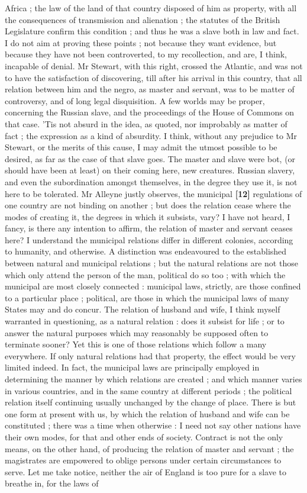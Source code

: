 \documentclass[a4paper]{article}
\begin{document}
Africa ; the law of the land of that country disposed of him as property, with all the consequences of transmission and alienation ; the statutes of the British Legislature confirm this condition ; and thus he was a slave both in law and fact. I do not aim at proving these points ; not because they want evidence, but because they have not been controverted, to my recollection, and are, I think, incapable of denial. Mr Stewart, with this right, crossed the Atlantic, and was not to have the satisfaction of discovering, till after his arrival in this country, that all relation between him and the negro, as master and servant, was to be matter of controversy, and of long legal disquisition. A few worlds may be proper, concerning the Russian slave, and the proceedings of the House of Commons on that case. 'Tis not absurd in the idea, as quoted, nor improbably as matter of fact ; the expression as a kind of absurdity. I think, without any prejudice to Mr Stewart, or the merits of this cause, I may admit the utmost possible to be desired, as far as the case of that slave goes. The master and slave were bot, (or should have been at least) on their coming here, new  creatures. Russian slavery, and even the subordination amongst themselves, in the degree they use it, is not here to be tolerated. Mr Alleyne justly observes, the municipal \textbf{[12]} regulations of one country are not binding on another ; but does the relation cease where the modes of creating it, the degrees in which it subsists, vary? I have not heard, I fancy, is there any intention to affirm, the relation of master and servant ceases here? I understand the municipal relations differ in different colonies, according to humanity, and otherwise. A distinction was endeavoured to the established between natural and municipal relations ; but the natural relations are not those which only attend the person of the man, political do so too ; with which the municipal are most closely connected : municipal laws, strictly, are those confined to a particular place ; political, are those in which the municipal laws of many States may and do concur. The relation of husband and wife, I think myself warranted in questioning, as a natural relation : does it subsist for life ; or to answer the natural purposes which may reasonably be supposed often to terminate sooner? Yet this is one of those relations which follow a many everywhere. If only natural relations had that property, the effect would be very limited indeed. In fact, the municipal laws are principally employed in determining the manner by which relations are created ; and which manner varies in various countries, and in the same country at different periods ; the political relation itself continuing usually unchanged by the change of place. There is but one form at present with us, by which the relation of husband and wife can be constituted ; there was a time when otherwise : I need not say other nations have their own modes, for that and other ends of society. Contract is not the only means, on the other hand, of producing the relation of master and servant ; the magistrates are empowered to oblige persons under certain circumstances to serve. Let me take notice, neither the air of England is too pure for a slave to breathe in, for the laws of 
\end{document}
